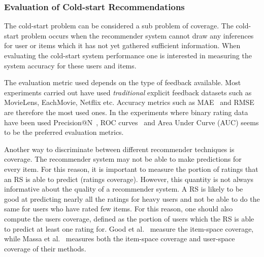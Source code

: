 

\subsubsection{Evaluation of Cold-start Recommendations}
\label{sec:cold-start-eval}

The cold-start problem can be considered a sub problem of coverage. The
cold-start problem occurs when the recommender system cannot draw any
inferences for user or items which it has not yet gathered sufficient
information. When evaluating the cold-start system performance one is
interested in measuring the system accuracy for these users and items.

The evaluation metric used depends on the type of feedback available.  Most
experiments carried out have used \emph{traditional} explicit feedback datasets
such as MovieLens, EachMovie, Netflix etc. Accuracy metrics such as
MAE~\cite{Rashid2002, Rashid2008, Massa2004, Massa2007, Stern2009} and
RMSE~\cite{Agarwal2009, Agarwal2010} are therefore the most used ones. In the
experiments where binary rating data have been used Precision@N~\cite{Liu2011,
Gantner2010}, ROC curves~\cite{Agarwal2009, Gantner2010, Schein2002} and Area
Under Curve (AUC) \cite{Liu2011, Gantner2010} seems to be the preferred
evaluation metrics.

Another way to discriminate between different recommender techniques is
coverage. The recommender system may not be able to make predictions for every
item. For this reason, it is important to measure the portion of ratings that
an RS is able to predict (ratings coverage). However, this quantity is not
always informative about the quality of a recommender system. A RS is likely to
be good at predicting nearly all the ratings for heavy users and not be able to
do the same for users who have rated few items. For this reason, one should
also compute the users coverage, defined as the portion of users which the RS
is able to predict at least one rating for. Good et al.~\cite{Good1999}
measure the item-space coverage, while Massa et al.~\cite{Massa2004,
Massa2007} measures both the item-space coverage and user-space coverage of
their methods.

